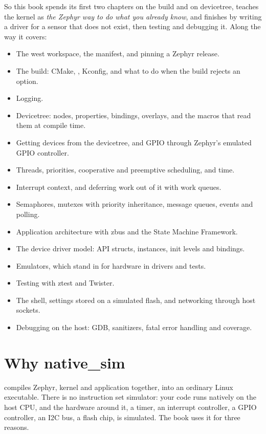 So this book spends its first two chapters on the build and on devicetree, teaches the kernel as
\emph{the Zephyr way to do what you already know}, and finishes by writing a driver for a sensor
that does not exist, then testing and debugging it. Along the way it covers:
\begin{itemize}
  \item The west workspace, the manifest, and pinning a Zephyr release.
  \item The build: CMake, , Kconfig, and what to do when the build rejects an
    option.
  \item Logging.
  \item Devicetree: nodes, properties, bindings, overlays, and the macros that read them at
    compile time.
  \item Getting devices from the devicetree, and GPIO through Zephyr's emulated GPIO controller.
  \item Threads, priorities, cooperative and preemptive scheduling, and time.
  \item Interrupt context, and deferring work out of it with work queues.
  \item Semaphores, mutexes with priority inheritance, message queues, events and polling.
  \item Application architecture with zbus and the State Machine Framework.
  \item The device driver model: API structs, instances, init levels and bindings.
  \item Emulators, which stand in for hardware in drivers and tests.
  \item Testing with ztest and Twister.
  \item The shell, settings stored on a simulated flash, and networking through host sockets.
  \item Debugging on the host: GDB, sanitizers, fatal error handling and coverage.
\end{itemize}

\section*{Why native\_sim}
 compiles Zephyr, kernel and application together, into an ordinary Linux
executable. There is no instruction set simulator: your code runs natively on the host CPU, and the
hardware around it, a timer, an interrupt controller, a GPIO controller, an I2C bus, a flash chip,
is simulated. The book uses it for three reasons.

